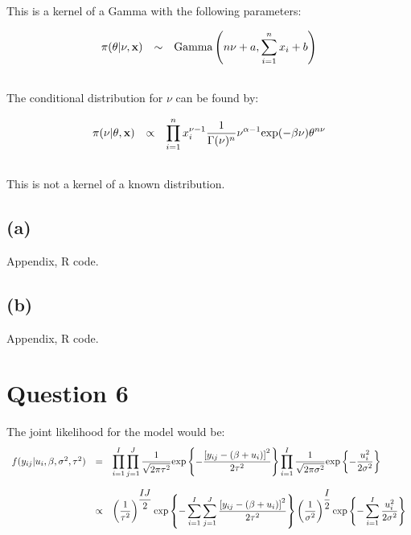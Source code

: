 \documentclass{article}
\begin{document}
This is a kernel of a Gamma with the following parameters:

\begin{equation*}
\begin{array}{lcl ll }

\pi(\theta|\nu,\textbf{x}) & \sim &  \mbox{Gamma}\left( n\nu + a,\displaystyle\sum_{i=1}^{n}x_i +b \right)  \\\\

 \end{array}
\end{equation*}

The conditional distribution for $\nu$ can be found by:

\begin{equation*}
\begin{array}{lcl ll }

\pi(\nu|\theta,\textbf{x}) & \propto & \displaystyle\prod_{i=1}^{n}x_i^{\nu -1}  \dfrac{1}{\Gamma(\nu)^n} \nu^{\alpha -1} \mbox{exp}(-\beta\nu) \theta^{n\nu} \\ \\

 \end{array}
\end{equation*}

This is not a kernel of a known distribution.

\subsection{(a)}

Appendix, R code.

\subsection{(b)}

Appendix, R code.

\section{Question 6}

The joint likelihood for the model would be:
\begin{equation*}
\begin{array}{lcl ll }
f(y_{ij}|u_i,\beta, \sigma^2, \tau^2) & = & \displaystyle\prod_{i=1}^{I}\prod_{j=1}^{J}\dfrac{1}{\sqrt{2\pi\tau^2}} \mbox{exp}\left\{ - \dfrac{\left[ y_{ij} - (\beta + u_i) \right]^2}{2\tau^2} \right\} \displaystyle\prod_{i=1}^{I}\dfrac{1}{\sqrt{2\pi\sigma^2}} \mbox{exp}\left\{ - \dfrac{u_i^2}{2\sigma^2} \right\} \\ \\

& \propto & \left(\dfrac{1}{\tau^2}\right)^{\dfrac{IJ}{2}} \mbox{exp}\left\{ - \displaystyle\sum_{i=1}^{I}\sum_{j=1}^{J}\frac{\left[ y_{ij} - (\beta + u_i) \right]^2}{2\tau^2} \right\} \left(\dfrac{1}{\sigma^2}\right)^{\dfrac{I}{2}} \mbox{exp}\left\{ - \displaystyle\sum_{i=1}^{I} \dfrac{u_i^2}{2\sigma^2} \right\} \\
 \end{array}
\end{equation*}
\end{document}
